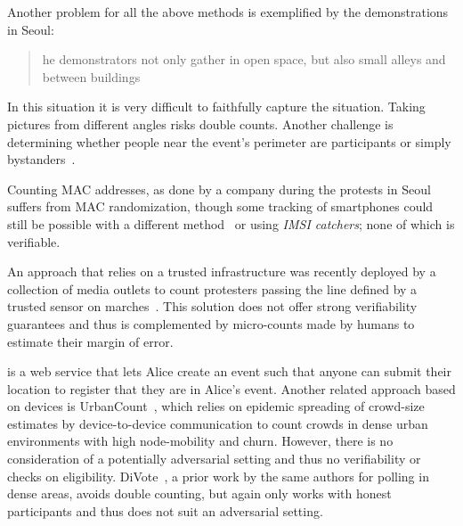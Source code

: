 Another problem for all the above methods is exemplified by the demonstrations in Seoul:
\blockcquote{2016DemonstrationsInSeoul}{%
  he demonstrators not only gather in open space, but also small alleys and between buildings%
}.
In this situation it is very difficult to faithfully capture the situation.
Taking pictures from different angles risks double counts. Another challenge is 
determining whether people near the event's perimeter are participants or 
simply bystanders~\cite{HowToEstimateCrowdSize}.

Counting MAC addresses, as done by a company during the protests in Seoul~\cite{2016DemonstrationsInSeoul} suffers from MAC randomization, though some tracking of smartphones could still be possible with a different method~\cite{WhyMACRandomizationIsNotEnough} or using \emph{IMSI catchers}; none of which is verifiable.

An approach that relies on a trusted infrastructure was recently deployed by a collection of media outlets to count protesters passing the line defined by a trusted sensor on marches~\cite{LeMondeProtestingSolution}. 
This solution does not offer strong verifiability guarantees and thus is complemented by micro-counts made by humans to estimate their margin of error.

\Textcite{CrowdCount} is a web service that lets Alice create an event such 
that anyone can submit their location to register that they are in Alice's 
event.
Another related approach based on devices is UrbanCount~\cite{UrbanCount}, which relies on epidemic spreading of crowd-size estimates by device-to-device communication to count crowds in dense urban environments with high node-mobility and churn.
However, there is no consideration of a potentially adversarial setting and thus no verifiability or checks on eligibility.  DiVote~\cite{DiVote}, a prior work by the same authors for polling in dense areas, avoids double counting, but again only works with honest participants and thus does not suit an adversarial setting.

